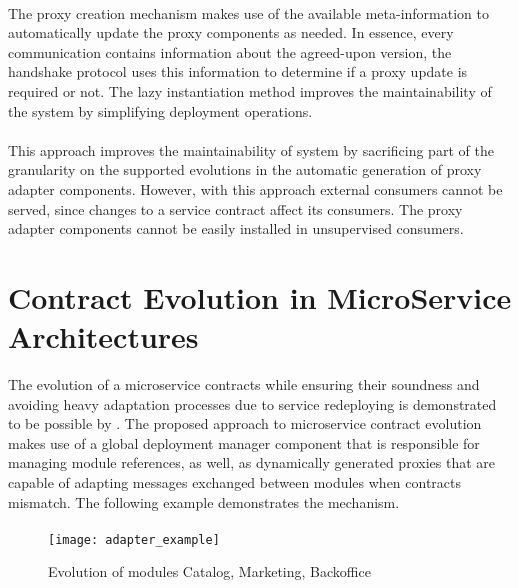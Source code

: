 \paragraph{}

The proxy creation mechanism makes use of the available meta-information
to automatically update the proxy components as needed.
In essence, every communication contains information about the agreed-upon version, the handshake protocol uses this information to determine if a proxy update is required or not.
The lazy instantiation method improves the maintainability of the system by
simplifying deployment operations.

\paragraph{}

This approach improves the maintainability of system by sacrificing part of the granularity on the supported evolutions in the automatic generation of proxy adapter components.
However, with this approach external consumers cannot be served, since changes to a service contract affect its consumers.
The proxy adapter components cannot be easily installed in unsupervised consumers.

\section{Contract Evolution in MicroService Architectures} %
\label{sec:contract_evolution_in_microservice_architectures}

The evolution of a microservice contracts while ensuring their soundness and
avoiding heavy adaptation processes due to service redeploying is demonstrated to be possible by \citeauthor{seco2020robust} \cite{seco2020robust}.
The proposed approach to microservice contract evolution \cite{seco2020robust} makes use of a global deployment manager component that is responsible for managing module references,
as well, as dynamically generated proxies that are capable of adapting messages exchanged between modules when contracts mismatch.
The following example demonstrates the mechanism.

\paragraph{}

\begin{figure}[htbp]
    \centering
    \texttt{[image: adapter\_example]}
    \caption{Evolution of modules Catalog, Marketing, Backoffice \cite{seco2020robust}}
    \label{fig:evolution_of_modules}
\end{figure}

